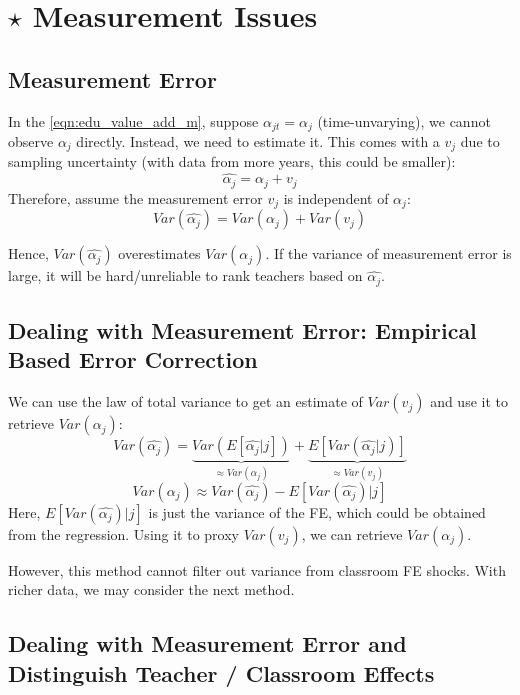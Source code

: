 \section{$\star$ Measurement Issues}

    \subsection{Measurement Error}

        In the \ref{eqn:edu_value_add_m}, suppose $\alpha_{jt}=\alpha_{j}$ (time-unvarying), we cannot observe $\alpha_j$ directly. Instead, we need to estimate it. This comes with a  $v_j$ due to sampling uncertainty (with data from more years, this could be smaller):
        $$\widehat{\alpha_j}=\alpha_j + v_j$$
        Therefore, assume the measurement error $v_j$ is independent of $\alpha_j$:
        $$Var(\widehat{\alpha_j})=Var(\alpha_j)+Var(v_j)$$
        
        Hence, $Var(\widehat{\alpha_j})$ overestimates $Var(\alpha_j)$. If the variance of measurement error is large, it will be hard/unreliable to rank teachers based on $\widehat{\alpha_j}$.

    \subsection{Dealing with Measurement Error: Empirical Based Error Correction}

        We can use the law of total variance to get an estimate of $Var(v_{j})$ and use it to retrieve $Var(\alpha_j)$:
        $$Var(\widehat{\alpha_j})=\underbrace{Var(E[\widehat{\alpha_j}|j])}_{\approx Var(\alpha_j)}+\underbrace{ E[Var(\widehat{\alpha_j}|j)] }_{ \approx Var(v_{j}) }$$
        $$Var(\alpha_j)\approx Var(\widehat{\alpha_j})-E[Var(\widehat{\alpha_j})|j]$$
        Here, $E[Var(\widehat{\alpha_j})|j]$ is just the variance of the FE, which could be obtained from the regression. Using it to proxy $Var(v_j)$, we can retrieve $Var(\alpha_j)$.
        
        However, this method cannot filter out variance from classroom FE shocks. With richer data, we may consider the next method.
        
    \subsection{Dealing with Measurement Error and Distinguish Teacher / Classroom Effects}

